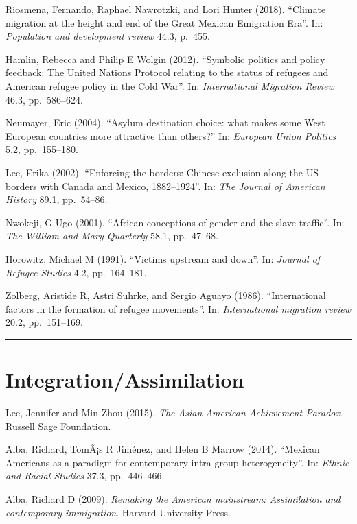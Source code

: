 \documentclass[
  12pt,
]{article}
\begin{document}
Riosmena, Fernando, Raphael Nawrotzki, and Lori Hunter (2018). ``Climate
migration at the height and end of the Great Mexican Emigration Era''.
In: \emph{Population and development review} 44.3, p.~455.

Hamlin, Rebecca and Philip E Wolgin (2012). ``Symbolic politics and
policy feedback: The United Nations Protocol relating to the status of
refugees and American refugee policy in the Cold War''. In:
\emph{International Migration Review} 46.3, pp.~586--624.

Neumayer, Eric (2004). ``Asylum destination choice: what makes some West
European countries more attractive than others?'' In:
\emph{European Union Politics} 5.2, pp.~155--180.

Lee, Erika (2002). ``Enforcing the borders: Chinese exclusion along the
US borders with Canada and Mexico, 1882--1924''. In:
\emph{The Journal of American History} 89.1, pp.~54--86.

Nwokeji, G Ugo (2001). ``African conceptions of gender and the slave
traffic''. In: \emph{The William and Mary Quarterly} 58.1, pp.~47--68.

Horowitz, Michael M (1991). ``Victims upstream and down''. In:
\emph{Journal of Refugee Studies} 4.2, pp.~164--181.

Zolberg, Aristide R, Astri Suhrke, and Sergio Aguayo (1986).
``International factors in the formation of refugee movements''. In:
\emph{International migration review} 20.2, pp.~151--169.

\begin{center}\rule{0.5\linewidth}{0.5pt}\end{center}

\hypertarget{integrationassimilation}{%
\section{\texorpdfstring{\textbf{Integration/Assimilation}}{Integration/Assimilation}}\label{integrationassimilation}}

Lee, Jennifer and Min Zhou (2015).
\emph{The Asian American Achievement Paradox}. Russell Sage Foundation.

Alba, Richard, TomÃ¡s R Jiménez, and Helen B Marrow (2014). ``Mexican
Americans as a paradigm for contemporary intra-group heterogeneity''.
In: \emph{Ethnic and Racial Studies} 37.3, pp.~446--466.

Alba, Richard D (2009).
\emph{Remaking the American mainstream: Assimilation and contemporary immigration}.
Harvard University Press.
\end{document}
